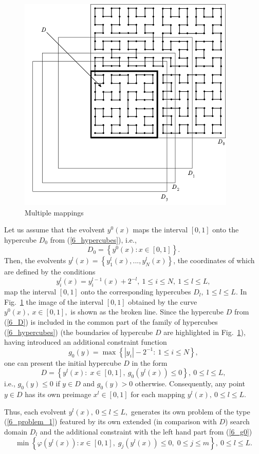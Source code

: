 \begin{figure}[t]
\includegraphics[width=0.7\linewidth]{figures/6_6.png}
\caption{Multiple mappings}
\label{6_fig_6}     
\end{figure}

Let us assume that the evolvent $y^0(x)$  maps the interval $[0,1]$ onto the hypercube $D_0$ from (\ref{6_hypercubes}), i.e.,
\[
D_0 = \left\{y^0(x) : x \in [0,1]\right\}.
\]
Then, the evolvents $y^l(x)=\left\{y_1^l(x),...,y_N^l(x)\right\}$, the coordinates of which are defined by the conditions 
\[
y_i^l(x)=y_i^{l-1}(x)+2^{-l},\ 1\leq i\leq N, \ 1\leq l\leq L,
\]
map the interval $[0,1]$ onto the corresponding hypercubes $D_l,\ 1\leq l \leq L$. In Fig.~\ref{6_fig_6} the image of the interval $[0,1]$ obtained by the curve $y^0(x),\ x\in [0,1],$ is shown as the broken line. Since the hypercube $D$ from (\ref{6_D}) is included in the common part of the family of hypercubes (\ref{6_hypercubes}) (the boundaries of hypercube $D$ are highlighted in Fig.~\ref{6_fig_6}), having introduced an additional constraint function
\begin{equation}\label{6_g0}
g_0(y)=\max\left\{\left|y_i\right| - 2^{-1}:\ 1\leq i\leq N\right\},
\end{equation}
one can present the initial hypercube $D$ in the form
\[
D=\left\{y^l(x):\; x\in [0,1],\ g_0(y^l(x))\leq 0 \right\},\ 0\leq l \leq L,
\]
i.e., $g_0(y) \leq 0$ if $y\in D$ and $g_0(y)>0$ otherwise. Consequently, any point $y \in D$ has its own preimage $x^l \in [0,1]$ for each mapping $y^l(x),\ 0\leq l\leq L$.

Thus, each evolvent $y^l(x),\ 0\leq l \leq L,$ generates its own problem of the type (\ref{6_problem_1}) featured by its own extended (in comparison with $D$) search domain $D_l$ and the additional constraint with the left hand part from (\ref{6_g0})
\begin{equation}\label{6_problem_l} 
\min{\left\{\varphi(y^l(x)):x\in [0,1], \; g_j(y^l(x))\leq 0, \; 0 \leq j \leq m\right\}}, \ 0 \leq l \leq L.
\end{equation} 

